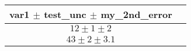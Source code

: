 \begin{tabular}{c|c}
  var1 $\pm$ test\_unc $\pm$ my\_2nd\_error \\\hline
  $12 \pm 1  \pm 2 $ \\
  $43 \pm 2  \pm 3.1 $ \\
\end{tabular}
